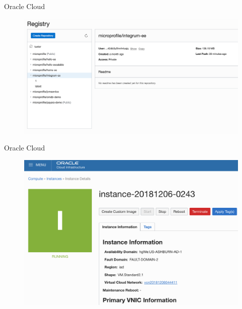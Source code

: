 \documentclass{beamer}
\begin{document}
\begin{frame}{Oracle Cloud}
\begin{figure}
	\centering
	\includegraphics[width=0.95\linewidth]{Images/oc1}
\end{figure}
\end{frame}

\begin{frame}{Oracle Cloud}
\begin{figure}
	\centering
	\includegraphics[width=0.95\linewidth]{Images/oc2}
\end{figure}
\end{frame}
\end{document}
